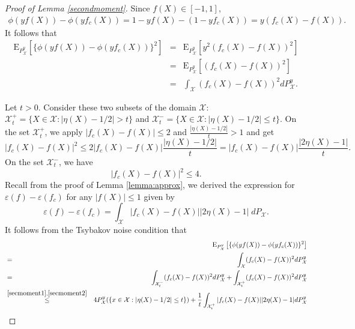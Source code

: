 \documentclass{article}
\begin{document}
\begin{proof}[Proof of Lemma \ref{secondmoment}]
Since $f(X) \in [-1,1]$, 
\begin{eqnarray*}
    \phi(yf(X)) - \phi(yf_c(X)) = 1-yf(X) - (1- yf_c(X)) = y(f_c(X) - f(X)). 
\end{eqnarray*}
It follows that 
\begin{eqnarray*}
    \mathrm{E}_{P_\mathcal{X}^y}[\{\phi(yf(X)) - \phi(yf_c(X))\}^2] 
    &=& \mathrm{E}_{P_\mathcal{X}^y}[y^2(f_c(X) - f(X))^2] \\
    &=& \mathrm{E}_{P_\mathcal{X}^y}[(f_c(X) - f(X))^2] \\
    &=& \int_{\mathcal{X}} (f_c(X) - f(X))^2 dP_{\mathcal{X}}^y. 
\end{eqnarray*}

Let $t>0$. Consider these two subsets of the domain $\mathcal{X}$: $\mathcal{X}_t^+ = \{X\in \mathcal{X}: |\eta(X)-1/2|>t\}$ and $\mathcal{X}_t^- = \{X\in \mathcal{X}: |\eta(X)-1/2|\leq t\}$. On the set  $\mathcal{X}_t^+$, we apply $|f_c(X) -f(X)| \leq 2$ and $\frac{|\eta(X)-1/2| }{t} >1$ and get
\begin{equation}\label{secmoment1}
    |f_c(X) -f(X)|^2 \leq 2 |f_c(X) -f(X)| \frac{|\eta(X)-1/2| }{t} = |f_c(X) -f(X)| \frac{|2\eta(X)-1| }{t}.
\end{equation}
On the set $\mathcal{X}_t^-$, we have \begin{equation}\label{secmoment2}
    |f_c(X) -f(X)|^2 \leq 4. 
\end{equation}
Recall from the proof of Lemma \ref{lemma:approx}, we derived the expression for  $\varepsilon(f) -\varepsilon(f_c)$ for any $|f(X)|\leq 1$ given by 
\begin{equation}\label{expression}
    \varepsilon(f) -\varepsilon(f_c)  
  = \int_\mathcal{X}  \left| f_c(X) - f(X)\right|  |2\eta(X)-1|\;d P_\mathcal{X}.
\end{equation}
It follows from the Tsybakov noise condition that 
\begin{eqnarray*}
  && \mathrm{E}_{P_\mathcal{X}^y}\left[\{\phi(yf(X))-\phi(yf_c(X))\}^2\right] \\
   &=&  \int_\mathcal{X} (f_c(X) -f(X))^2 d{P_\mathcal{X}^y}  \\
   &=& \int_{\mathcal{X}_t^-} (f_c(X) -f(X))^2 d{P_\mathcal{X}^y} + \int_{\mathcal{X}_t^+} (f_c(X) -f(X))^2 d{P_\mathcal{X}^y}\\
   &\stackrel{\eqref{secmoment1}, \eqref{secmoment2}}{\leq} & 4 {P_\mathcal{X}^y}(\{x\in \mathcal{X}: |\eta(X)-1/2| \leq t\}) + 
   \frac{1}{t}\int_{\mathcal{X}_t^+}  |f_c(X) -f(X)| |2\eta(X)-1| d{P_\mathcal{X}^y}\\

\end{eqnarray*}
\end{proof}
\end{document}
